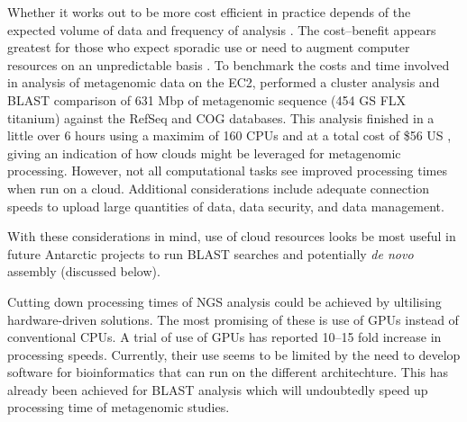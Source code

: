 Whether it works out to be more cost efficient in practice depends of the expected volume of data and frequency of analysis \cite{Wilkening2009}.
The cost--benefit appears greatest for those who expect sporadic use or need to augment computer resources on an unpredictable basis \cite{Wilkening2009}.
To benchmark the costs and time involved in analysis of metagenomic data on the \ac{EC2}, \citet{Angiuoli2011} performed a cluster analysis and \acs{BLAST} comparison of 631 Mbp of metagenomic sequence (454 GS FLX titanium) against the RefSeq and \acs{COG} databases.
This analysis finished in a little over 6 hours using a maximim of 160 \acs{CPU}s and at a total cost of \$56 US \cite{Angiuoli2011}, giving an indication of how clouds might be leveraged for metagenomic processing.
However, not all computational tasks see improved processing times when run on a cloud.
Additional considerations include adequate connection speeds to upload large quantities of data, data security, and data management.

With these considerations in mind, use of cloud resources looks be most useful in future Antarctic projects to run \acs{BLAST} searches and potentially \emph{de novo} assembly (discussed below).

Cutting down processing times of \ac{NGS} analysis could be achieved by ultilising hardware-driven solutions.
The most promising of these is use of \acp{GPU} instead of conventional \acp{CPU}.
A trial of use of \acp{GPU} has reported 10--15 fold increase in processing speeds.
Currently, their use seems to be limited by the need to develop software for bioinformatics that can run on the different architechture.
This has already been achieved for \acs{BLAST} analysis which will undoubtedly speed up processing time of metagenomic studies.

